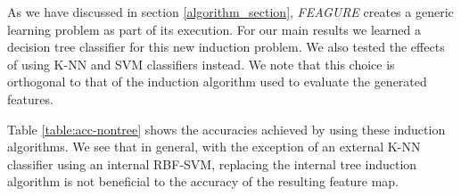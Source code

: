 \documentclass{article}
\theoremstyle{definition}
\begin{document}
As we have discussed in section \ref{algorithm_section}, \emph{FEAGURE} creates a generic learning problem as part of its execution. For our main results we learned a decision tree classifier for this new induction problem.
We also tested the effects of using K-NN and SVM classifiers instead. %
We note that this choice is orthogonal to that of the induction algorithm used to evaluate the generated features.

Table \ref{table:acc-nontree} shows the accuracies achieved by using these induction algorithms. We see that in general, with the exception of an external K-NN classifier using an internal RBF-SVM, replacing the internal tree induction algorithm is not beneficial to the accuracy of the resulting feature map.
\end{document}
